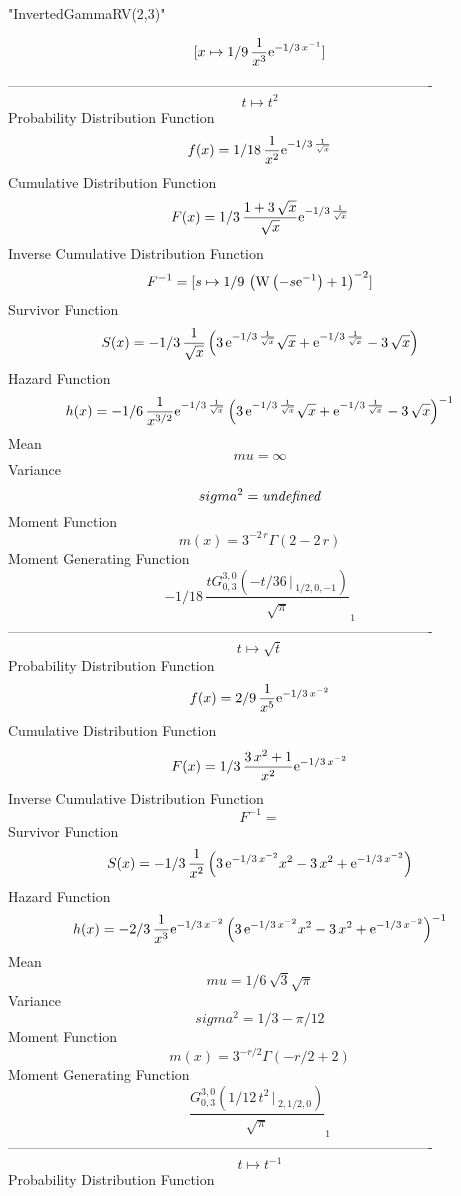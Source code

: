 \documentclass[12pt]{article}
\begin{document}
 
                           "InvertedGammaRV(2,3)"

$$[x\mapsto 1/9\,{\frac {1}{{x}^{3}}{{\rm e}^{-1/3\,{x}^{-1}}}}]
$$-------------------------------------------------------------------------------------------  \\$$t\mapsto {t}^{2}
$$Probability Distribution Function 
$$  f(x)=1/18\,{\frac {1}{{x}^{2}}{{\rm e}^{-1/3\,{\frac {1}{\sqrt {x}}}}}}
$$Cumulative Distribution Function  
 $$F(x)=1/3\,{\frac {1+3\,\sqrt {x}}{\sqrt {x}}{{\rm e}^{-1/3\,{\frac {1}{
\sqrt {x}}}}}}
$$ Inverse Cumulative Distribution Function 
  $$F^{-1} = [s\mapsto 1/9\, \left( {\rm W} \left(-s{{\rm e}^{-1}}\right)+1
 \right) ^{-2}]
$$Survivor Function 
 $$ S(x)=-1/3\,{\frac {1}{\sqrt {x}} \left( 3\,{{\rm e}^{-1/3\,{\frac {1}{
\sqrt {x}}}}}\sqrt {x}+{{\rm e}^{-1/3\,{\frac {1}{\sqrt {x}}}}}-3\,
\sqrt {x} \right) }
$$ Hazard Function 
 $$ h(x)=-1/6\,{\frac {1}{{x}^{3/2}}{{\rm e}^{-1/3\,{\frac {1}{\sqrt {x}}}}}
 \left( 3\,{{\rm e}^{-1/3\,{\frac {1}{\sqrt {x}}}}}\sqrt {x}+{{\rm e}^
{-1/3\,{\frac {1}{\sqrt {x}}}}}-3\,\sqrt {x} \right) ^{-1}}
$$Mean 
 $$ mu=\infty 
$$ Variance 
 $$ sigma^2 = {\it undefined}
$$Moment Function 
 $$ m(x) = {3}^{-2\,r}\Gamma \left( 2-2\,r \right) 
$$ Moment Generating Function 
 $$-1/18\,{\frac {t
G^{3, 0}_{0, 3}\left(-t/36\, \Big\vert\,^{}_{1/2, 0, -1}\right)}{
\sqrt {\pi}}}_{{1}}
$$-------------------------------------------------------------------------------------------  \\$$t\mapsto \sqrt {t}
$$Probability Distribution Function 
$$  f(x)=2/9\,{\frac {1}{{x}^{5}}{{\rm e}^{-1/3\,{x}^{-2}}}}
$$Cumulative Distribution Function  
 $$F(x)=1/3\,{\frac {3\,{x}^{2}+1}{{x}^{2}}{{\rm e}^{-1/3\,{x}^{-2}}}}
$$ Inverse Cumulative Distribution Function 
  $$F^{-1} =
$$Survivor Function 
 $$ S(x)=-1/3\,{\frac {1}{{x}^{2}} \left( 3\,{{\rm e}^{-1/3\,{x}^{-2}}}{x}^{2}-
3\,{x}^{2}+{{\rm e}^{-1/3\,{x}^{-2}}} \right) }
$$ Hazard Function 
 $$ h(x)=-2/3\,{\frac {1}{{x}^{3}}{{\rm e}^{-1/3\,{x}^{-2}}} \left( 3\,{{\rm e}
^{-1/3\,{x}^{-2}}}{x}^{2}-3\,{x}^{2}+{{\rm e}^{-1/3\,{x}^{-2}}}
 \right) ^{-1}}
$$Mean 
 $$ mu=1/6\,\sqrt {3}\sqrt {\pi}
$$ Variance 
 $$ sigma^2 = 1/3-\pi/12
$$Moment Function 
 $$ m(x) = {3}^{-r/2}\Gamma \left( -r/2+2 \right) 
$$ Moment Generating Function 
 $${\frac {
G^{3, 0}_{0, 3}\left(1/12\,{t}^{2}\, \Big\vert\,^{}_{2, 1/2, 0}\right)
}{\sqrt {\pi}}}_{{1}}
$$-------------------------------------------------------------------------------------------  \\$$t\mapsto {t}^{-1}
$$Probability Distribution Function 
\end{document}
